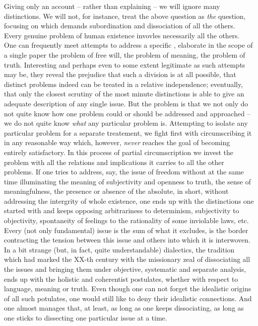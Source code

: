Giving only an account -- rather than explaining -- we will ignore many
distinctions. We will not, for instance, treat the above question as {\em the}
question, focusing on which demands subordination and dissociation of
 all the others. Every genuine problem of human
existence invovles necessarily all the others. One can frequently meet attempts
to address a specific , elaborate in the scope of a
single paper the problem of free will, the problem of meaning, the problem of
truth.  Interesting and perhaps even to some extent legitimate as such attempts
may be, they reveal the prejudice that such a division is at all possible, that
distinct problems indeed can be treated in a relative independence; eventually,
that only the closest scrutiny of the most minute distinctions is able to give an
adequate description of any single issue. But the problem is that we not only do
not quite know how one problem could or should be addressed and approached
-- we do not quite know {\em what} any particular problem is. Attempting to isolate any
particular problem for a separate treatement, we fight first with circumscribing it in
any reasonable way which, however, {\em never} reaches the goal of becoming
entirely satisfactory. In this process of 
partial circumscription we invest the problem with all the relations and
implications it carries to all the other problems. 
If one tries to address, say, the issue of freedom without at the same time
illuminating the meaning of subjectivity and openness to truth, the sense of
meaningfulness, the presence or absence of the absolute, in short, without
addressing the intergrity of whole existence, one ends up with the
distinctions one started with and keeps opposing arbitrariness to determinism,
subjectivity to objectivity, spontaneity of feelings to the rationality of some 
inviolable laws, etc.  Every (not only fundamental) issue is the sum of what it
excludes, is the border contracting the tension between this issue and others
into which it is interwoven. In a bit strange (but, in fact, quite understandable)
dialectics, the tradition which had marked the XX-th century with the missionary
zeal of dissociating all the issues and bringing them under objective, systematic and
separate analysis, ends up with the holistic and coherentist postulates, whether
with respect to language, meaning or truth.   Even though one can not forget the idealistic origins of all such
potulates, one would still like to deny their 
idealistic connections. And one almost manages that, at least, 
as long as one keeps dissociating, as long as one sticks to dissecting one 
particular issue at a time.

